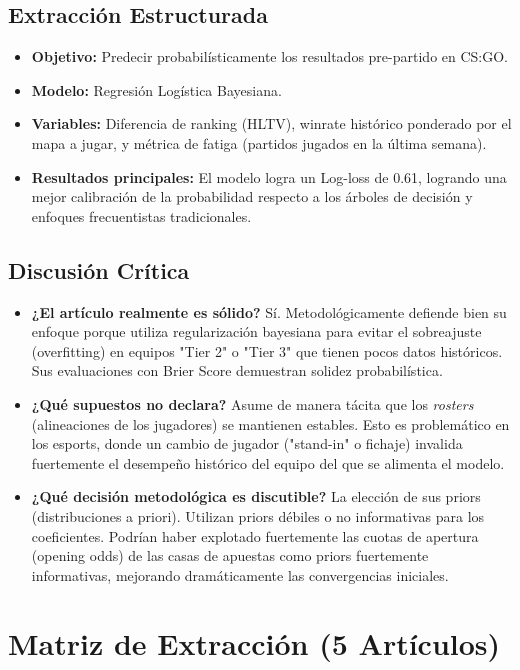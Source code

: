 \documentclass{article}
\begin{document}
\subsection{Extracción Estructurada}

\begin{itemize}
    \item \textbf{Objetivo:} Predecir probabilísticamente los resultados pre-partido en CS:GO.
    \item \textbf{Modelo:} Regresión Logística Bayesiana.
    \item \textbf{Variables:} Diferencia de ranking (HLTV), winrate histórico ponderado por el mapa a jugar, y métrica de fatiga (partidos jugados en la última semana).
    \item \textbf{Resultados principales:} El modelo logra un Log-loss de 0.61, logrando una mejor calibración de la probabilidad respecto a los árboles de decisión y enfoques frecuentistas tradicionales.
\end{itemize}

\subsection{Discusión Crítica}

\begin{itemize}
    \item \textbf{¿El artículo realmente es sólido?} Sí. Metodológicamente defiende bien su enfoque porque utiliza regularización bayesiana para evitar el sobreajuste (overfitting) en equipos "Tier 2" o "Tier 3" que tienen pocos datos históricos. Sus evaluaciones con Brier Score demuestran solidez probabilística.
    \item \textbf{¿Qué supuestos no declara?} Asume de manera tácita que los \textit{rosters} (alineaciones de los jugadores) se mantienen estables. Esto es problemático en los esports, donde un cambio de jugador ("stand-in" o fichaje) invalida fuertemente el desempeño histórico del equipo del que se alimenta el modelo.
    \item \textbf{¿Qué decisión metodológica es discutible?} La elección de sus priors (distribuciones a priori). Utilizan priors débiles o no informativas para los coeficientes. Podrían haber explotado fuertemente las cuotas de apertura (opening odds) de las casas de apuestas como priors fuertemente informativas, mejorando dramáticamente las convergencias iniciales.
\end{itemize}

\section{Matriz de Extracción (5 Artículos)}
\end{document}
